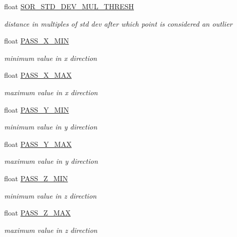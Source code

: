 \begin{DoxyCompactItemize}
float \hyperlink{classdatmo_1_1cloud__segmentation_ae1c32b9f5741dd7d212f2745f8784de0}{S\+O\+R\+\_\+\+S\+T\+D\+\_\+\+D\+E\+V\+\_\+\+M\+U\+L\+\_\+\+T\+H\+R\+E\+SH}
\begin{DoxyCompactList}\small\item\em distance in multiples of std dev after which point is considered an outlier \end{DoxyCompactList}\item 
float \hyperlink{classdatmo_1_1cloud__segmentation_a503bba212f9c15b767d512771b1559c2}{P\+A\+S\+S\+\_\+\+X\+\_\+\+M\+IN}
\begin{DoxyCompactList}\small\item\em minimum value in x direction \end{DoxyCompactList}\item 
float \hyperlink{classdatmo_1_1cloud__segmentation_a12f8209c6640d67c23cac18b2d8b7964}{P\+A\+S\+S\+\_\+\+X\+\_\+\+M\+AX}
\begin{DoxyCompactList}\small\item\em maximum value in x direction \end{DoxyCompactList}\item 
float \hyperlink{classdatmo_1_1cloud__segmentation_af95645fb925c485f397321d6e07c4574}{P\+A\+S\+S\+\_\+\+Y\+\_\+\+M\+IN}
\begin{DoxyCompactList}\small\item\em minimum value in y direction \end{DoxyCompactList}\item 
float \hyperlink{classdatmo_1_1cloud__segmentation_abacc76df1e25e42d25c1822c2637fa00}{P\+A\+S\+S\+\_\+\+Y\+\_\+\+M\+AX}
\begin{DoxyCompactList}\small\item\em maximum value in y direction \end{DoxyCompactList}\item 
float \hyperlink{classdatmo_1_1cloud__segmentation_acb71ade7e486ad1cafe15c441903f3e0}{P\+A\+S\+S\+\_\+\+Z\+\_\+\+M\+IN}
\begin{DoxyCompactList}\small\item\em minimum value in z direction \end{DoxyCompactList}\item 
float \hyperlink{classdatmo_1_1cloud__segmentation_a05b70936af05654abb9b1924ab593d08}{P\+A\+S\+S\+\_\+\+Z\+\_\+\+M\+AX}
\begin{DoxyCompactList}\small\item\em maximum value in z direction \end{DoxyCompactList}\item 

\end{DoxyCompactItemize}
